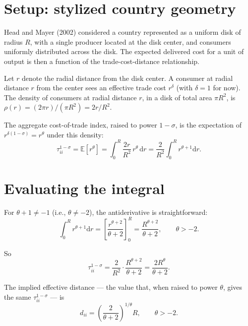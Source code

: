 \documentclass[11pt,letterpaper,oneside]{book}
\theoremstyle{definition}
\theoremstyle{remark}
\newcommand{\E}{\mathbb{E}}
\newcommand{\diff}{\mathrm{d}}
\begin{document}
\section{Setup: stylized country geometry}

Head and Mayer (2002) considered a country represented as a uniform disk of radius $R$, with a single producer located at the disk center, and consumers uniformly distributed across the disk. The expected delivered cost for a unit of output is then a function of the trade-cost-distance relationship.

Let $r$ denote the radial distance from the disk center. A consumer at radial distance $r$ from the center sees an effective trade cost $r^\delta$ (with $\delta = 1$ for now). The density of consumers at radial distance $r$, in a disk of total area $\pi R^2$, is $\rho(r) = (2\pi r)/(\pi R^2) = 2r/R^2$.

The aggregate cost-of-trade index, raised to power $1-\sigma$, is the expectation of $r^{\delta(1-\sigma)} = r^\theta$ under this density:
\begin{equation}
\tau_{ii}^{1-\sigma} = \E[r^\theta] = \int_0^R \frac{2r}{R^2} \, r^\theta \, \diff r = \frac{2}{R^2} \int_0^R r^{\theta + 1} \diff r.
\label{eq:hm-integral}
\end{equation}

\section{Evaluating the integral}

For $\theta + 1 \neq -1$ (i.e., $\theta \neq -2$), the antiderivative is straightforward:
\begin{equation}
\int_0^R r^{\theta+1} \diff r = \left[ \frac{r^{\theta+2}}{\theta+2} \right]_0^R = \frac{R^{\theta+2}}{\theta+2}, \qquad \theta > -2.
\end{equation}

So
\begin{equation}
\tau_{ii}^{1-\sigma} = \frac{2}{R^2} \cdot \frac{R^{\theta+2}}{\theta+2} = \frac{2 R^\theta}{\theta + 2}.
\label{eq:hm-integral-evaluated}
\end{equation}

The implied effective distance --- the value that, when raised to power $\theta$, gives the same $\tau_{ii}^{1-\sigma}$ --- is
\begin{equation}
\boxed{d_{ii} = \left( \frac{2}{\theta + 2} \right)^{1/\theta} R, \qquad \theta > -2.}
\label{eq:hm-closed-form}
\end{equation}
\end{document}
